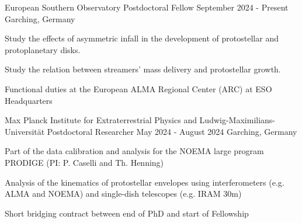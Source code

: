 

\begin{cventries}
	
    \cventry
	{European Southern Observatory} %
	{Postdoctoral Fellow} %
	{September 2024 - Present} %
	{Garching, Germany} %
	{ \begin{cvitems} %
			\item{Study the effects of asymmetric infall in the development of protostellar and protoplanetary disks.}
            \item{Study the relation between streamers' mass delivery and protostellar growth.}
            \item{Functional duties at the European ALMA Regional Center (ARC) at ESO Headquarters}
		\end{cvitems}
	}
	\cventry
	{Max Planck Institute for Extraterrestrial Physics and Ludwig-Maximilians-Universit\"at} %
	{Postdoctoral Researcher} %
	{May 2024 - August 2024} %
	{Garching, Germany} %
	{ \begin{cvitems} %
			\item{Part of the data calibration and analysis for the NOEMA large program PRODIGE (PI: P. Caselli and Th. Henning)}
			\item{Analysis of the kinematics of protostellar envelopes using interferometers (e.g. ALMA and NOEMA) and single-dish telescopes (e.g. IRAM 30m)}
            \item{Short bridging contract between end of PhD and start of Fellowship}
		\end{cvitems}
	}
	
\end{cventries}